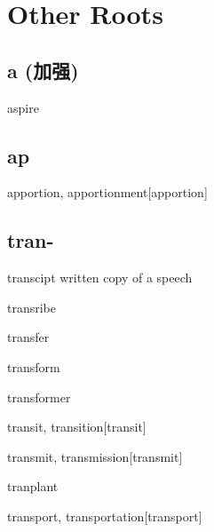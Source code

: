 \chapter{Other Roots}

\section{a (加强)}

\begin{wordRef}{aspire}
\end{wordRef}

\section{ap}

\begin{wordRef}{apportion, apportionment}[apportion]
\end{wordRef}

\section{tran-}

\begin{wordRef}{transcipt}
    written copy of a speech
\end{wordRef}

\begin{wordRef}{transribe}
\end{wordRef}

\begin{wordRef}{transfer}
\end{wordRef}

\begin{wordRef}{transform}
\end{wordRef}

\begin{wordRef}{transformer}
\end{wordRef}

\begin{wordRef}{transit, transition}[transit]
\end{wordRef}

\begin{wordRef}{transmit, transmission}[transmit]
\end{wordRef}

\begin{wordRef}{tranplant}
\end{wordRef}

\begin{wordRef}{transport, transportation}[transport]
\end{wordRef}

